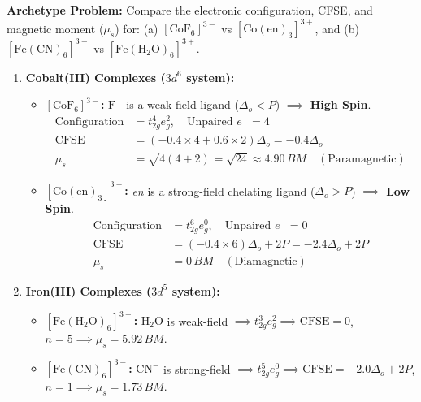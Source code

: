 \documentclass[10pt,a4paper]{article}
\begin{document}
\begin{usecasebox}
\textbf{Archetype Problem:} Compare the electronic configuration, CFSE, and magnetic moment ($\mu_s$) for:
(a) $[\mathrm{CoF_6}]^{3-}$ vs $[\mathrm{Co(en)_3}]^{3+}$, and (b) $[\mathrm{Fe(CN)_6}]^{3-}$ vs $[\mathrm{Fe(H_2O)_6}]^{3+}$.
\begin{enumerate}
  \item \textbf{Cobalt(III) Complexes ($3d^6$ system):}
  \begin{itemize}
    \item \textbf{$[\mathrm{CoF_6}]^{3-}$:} $\mathrm{F^-}$ is a weak-field ligand ($\Delta_o < P$) $\implies$ \textbf{High Spin}.
    \begin{align*}
      \text{Configuration} &= t_{2g}^4 e_g^2, \quad \text{Unpaired } e^- = 4 \\
      \text{CFSE} &= (-0.4 \times 4 + 0.6 \times 2)\Delta_o = -0.4\Delta_o \\
      \mu_s &= \sqrt{4(4+2)} = \sqrt{24} \approx 4.90\,\si{BM} \quad (\text{Paramagnetic})
    \end{align*}
    \item \textbf{$[\mathrm{Co(en)_3}]^{3-}$:} \textit{en} is a strong-field chelating ligand ($\Delta_o > P$) $\implies$ \textbf{Low Spin}.
    \begin{align*}
      \text{Configuration} &= t_{2g}^6 e_g^0, \quad \text{Unpaired } e^- = 0 \\
      \text{CFSE} &= (-0.4 \times 6)\Delta_o + 2P = -2.4\Delta_o + 2P \\
      \mu_s &= 0\,\si{BM} \quad (\text{Diamagnetic})
    \end{align*}
  \end{itemize}
  \item \textbf{Iron(III) Complexes ($3d^5$ system):}
  \begin{itemize}
    \item \textbf{$[\mathrm{Fe(H_2O)_6}]^{3+}$:} $\mathrm{H_2O}$ is weak-field $\implies t_{2g}^3 e_g^2 \implies \text{CFSE} = 0$, $n=5 \implies \mu_s = 5.92\,\si{BM}$.
    \item \textbf{$[\mathrm{Fe(CN)_6}]^{3-}$:} $\mathrm{CN^-}$ is strong-field $\implies t_{2g}^5 e_g^0 \implies \text{CFSE} = -2.0\Delta_o + 2P$, $n=1 \implies \mu_s = 1.73\,\si{BM}$.
  \end{itemize}
\end{enumerate}
\end{usecasebox}
\end{document}
